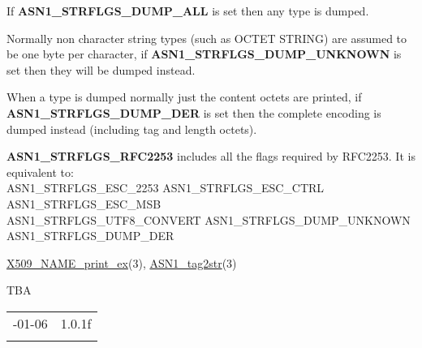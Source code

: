 \documentclass[]{article}
\let\realtextbf=\textbf
\renewcommand{\textbf}[1]{\textcolor{boldcolor}{\realtextbf{#1}}}
\renewcommand{\emph}[1]{\underline{#1}}
\begin{document}
If \textbf{ASN1\_STRFLGS\_DUMP\_ALL} is set then any type is dumped.

Normally non character string types (such as OCTET STRING) are assumed
to be one byte per character, if \textbf{ASN1\_STRFLGS\_DUMP\_UNKNOWN}
is set then they will be dumped instead.

When a type is dumped normally just the content octets are printed, if
\textbf{ASN1\_STRFLGS\_DUMP\_DER} is set then the complete encoding is
dumped instead (including tag and length octets).

\textbf{ASN1\_STRFLGS\_RFC2253} includes all the flags required by
RFC2253. It is equivalent to: \\ ASN1\_STRFLGS\_ESC\_2253 \textbar{}
ASN1\_STRFLGS\_ESC\_CTRL \textbar{} ASN1\_STRFLGS\_ESC\_MSB \textbar{}
\\ ASN1\_STRFLGS\_UTF8\_CONVERT \textbar{} ASN1\_STRFLGS\_DUMP\_UNKNOWN
ASN1\_STRFLGS\_DUMP\_DER


\emph{X509\_NAME\_print\_ex}(3), \emph{ASN1\_tag2str}(3)


TBA

\begin{longtable}[c]{@{}ll@{}}
\toprule\addlinespace
2014-01-06 & 1.0.1f
\\\addlinespace
\bottomrule
\end{longtable}
\end{document}
